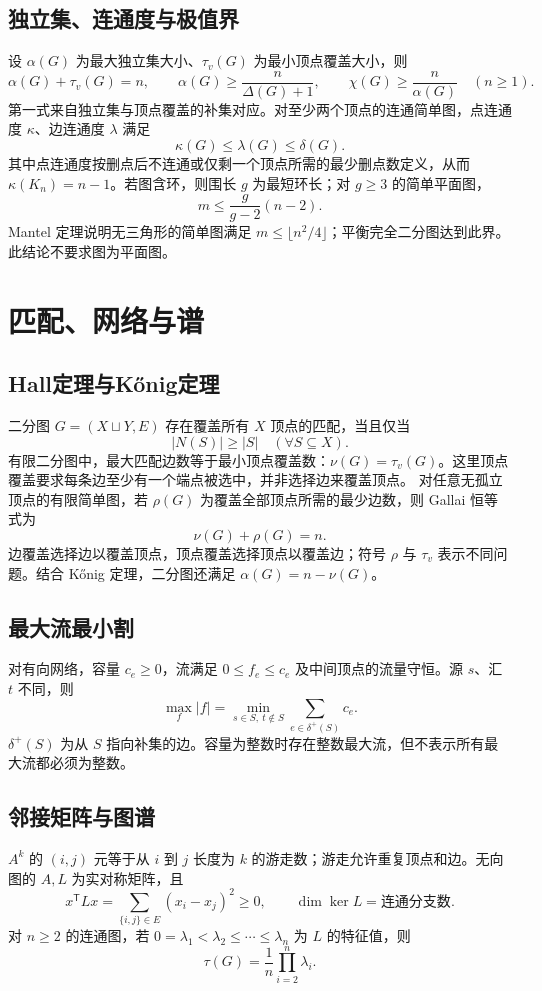 \documentclass[../main.tex]{subfiles}
\begin{document}
\subsection{独立集、连通度与极值界}
设 $\alpha(G)$ 为最大独立集大小、$\tau_v(G)$ 为最小顶点覆盖大小，则
\[
\alpha(G)+\tau_v(G)=n,\qquad
\alpha(G)\ge\frac n{\Delta(G)+1},\qquad
\chi(G)\ge\frac n{\alpha(G)}\quad(n\ge1).
\]
第一式来自独立集与顶点覆盖的补集对应。对至少两个顶点的连通简单图，点连通度 $\kappa$、边连通度 $\lambda$ 满足
\[
\kappa(G)\le\lambda(G)\le\delta(G).
\]
其中点连通度按删点后不连通或仅剩一个顶点所需的最少删点数定义，从而 $\kappa(K_n)=n-1$。若图含环，则围长 $g$ 为最短环长；对 $g\ge3$ 的简单平面图，
\[
m\le\frac g{g-2}(n-2).
\]
Mantel 定理说明无三角形的简单图满足 $m\le\lfloor n^2/4\rfloor$；平衡完全二分图达到此界。此结论不要求图为平面图。
\section{匹配、网络与谱}
\subsection{Hall定理与Kőnig定理}
二分图 $G=(X\sqcup Y,E)$ 存在覆盖所有 $X$ 顶点的匹配，当且仅当
\[
|N(S)|\ge|S|\quad(\forall S\subseteq X).
\]
有限二分图中，最大匹配边数等于最小顶点覆盖数：$\nu(G)=\tau_v(G)$。这里顶点覆盖要求每条边至少有一个端点被选中，并非选择边来覆盖顶点。
对任意无孤立顶点的有限简单图，若 $\rho(G)$ 为覆盖全部顶点所需的最少边数，则 Gallai 恒等式为
\[
\nu(G)+\rho(G)=n.
\]
边覆盖选择边以覆盖顶点，顶点覆盖选择顶点以覆盖边；符号 $\rho$ 与 $\tau_v$ 表示不同问题。结合 Kőnig 定理，二分图还满足 $\alpha(G)=n-\nu(G)$。
\subsection{最大流最小割}
对有向网络，容量 $c_e\ge0$，流满足 $0\le f_e\le c_e$ 及中间顶点的流量守恒。源 $s$、汇 $t$ 不同，则
\[
\max_f|f|=\min_{s\in S,\ t\notin S}\sum_{e\in\delta^+(S)}c_e.
\]
$\delta^+(S)$ 为从 $S$ 指向补集的边。容量为整数时存在整数最大流，但不表示所有最大流都必须为整数。
\subsection{邻接矩阵与图谱}
$A^k$ 的 $(i,j)$ 元等于从 $i$ 到 $j$ 长度为 $k$ 的游走数；游走允许重复顶点和边。无向图的 $A,L$ 为实对称矩阵，且
\[
x^{\mathsf T}Lx=\sum_{\{i,j\}\in E}(x_i-x_j)^2\ge0,
\qquad\dim\ker L=\text{连通分支数}.
\]
对 $n\ge2$ 的连通图，若 $0=\lambda_1<\lambda_2\le\cdots\le\lambda_n$ 为 $L$ 的特征值，则
\[
\tau(G)=\frac1n\prod_{i=2}^n\lambda_i.
\]
\end{document}
